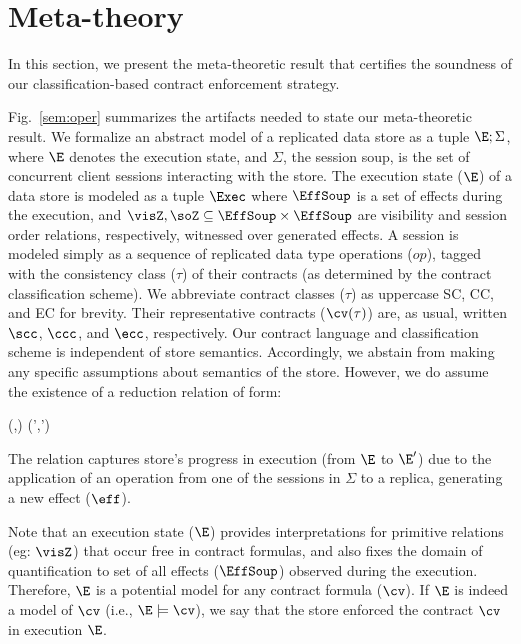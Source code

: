 \section{Meta-theory}
\label{sec:core-opsem}

In this section, we present the meta-theoretic result that certifies
the soundness of our classification-based contract enforcement
strategy. 

Fig.~\ref{sem:oper} summarizes the artifacts needed to state our
meta-theoretic result. We formalize an abstract model of a replicated
data store as a tuple $\E;\Sigma$, where $\E$ denotes the execution
state, and $\Sigma$, the session soup, is the set of concurrent client
sessions interacting with the store. The execution state ($\E$) of a
data store is modeled as a tuple $\Exec$ where $\EffSoup$ is a set of
effects during the execution, and $\visZ,\soZ \subseteq \EffSoup
\times \EffSoup$ are visibility and session order relations,
respectively, witnessed over generated effects. A session is modeled
simply as a sequence of replicated data type operations ($op$), tagged
with the consistency class ($\tau$) of their contracts (as determined
by the contract classification scheme). We abbreviate contract classes
($\tau$) as uppercase {\sf SC}, {\sf CC}, and {\sf EC} for brevity.
Their representative contracts ($\cv(\tau)$) are, as usual, written
$\scc$, $\ccc$, and $\ecc$, respectively.  Our contract language and
classification scheme is independent of store semantics. Accordingly,
we abstain from making any specific assumptions about semantics of the
store. However, we do assume the existence of a reduction relation of
form:
\begin{smathpar} 
  \auxred{} {(\E,\Sigma)} {\eff} {(\E',\Sigma')}
\end{smathpar}
\noindent The relation captures store's progress in execution (from
$\E$ to $\E'$) due to the application of an operation from one of the
sessions in $\Sigma$ to a replica, generating a new effect ($\eff$).

Note that an execution state ($\E$) provides interpretations for
primitive relations (eg: $\visZ$) that occur free in contract
formulas, and also fixes the domain of quantification to set of all
effects ($\EffSoup$) observed during the execution. Therefore, $\E$ is
a potential model for any contract formula ($\cv$). If $\E$ is indeed
a model of $\cv$ (i.e., $\E \models \cv$), we say that the store
enforced the contract $\cv$ in execution $\E$. 


